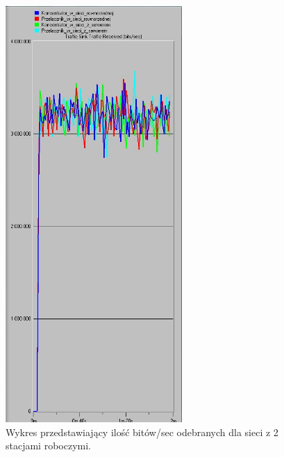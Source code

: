 \documentclass{article}
\begin{document}
\begin{figure}[H]
  \centering
  \includegraphics[width=0.60\textwidth]{screens/2_recv.png}
 \caption{Wykres przedstawiający ilość bitów/sec odebranych dla sieci z 2 stacjami roboczymi.}
 \label{fig:2stacjer}
\end{figure}
\end{document}

